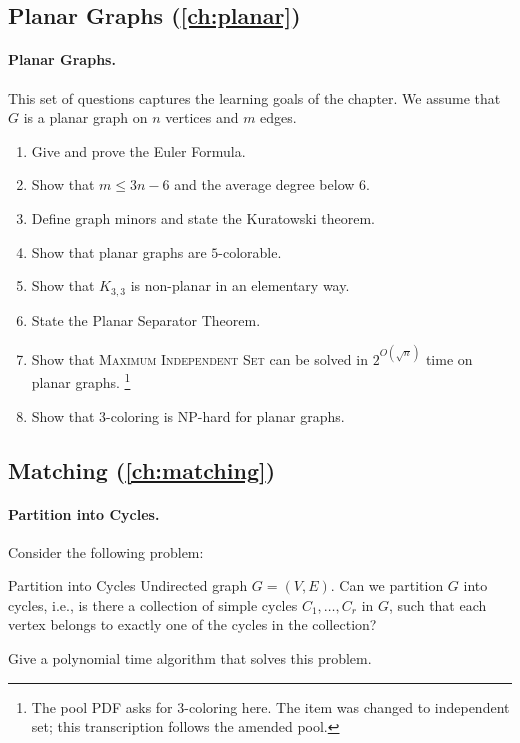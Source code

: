 \subsection*{Planar Graphs (\cref{ch:planar})}

\paragraph{Planar Graphs.}
This set of questions captures the learning goals of the chapter. We assume
that $G$ is a planar graph on $n$ vertices and $m$ edges.
\begin{enumerate}
  \item Give and prove the Euler Formula.
  \item Show that $m \le 3n-6$ and the average degree below $6$.
  \item Define graph minors and state the Kuratowski theorem.
  \item Show that planar graphs are $5$-colorable.
  \item Show that $K_{3,3}$ is non-planar in an elementary way.
  \item State the Planar Separator Theorem.
  \item Show that \textsc{Maximum Independent Set} can be solved in
        $2^{O(\sqrt{n})}$ time on planar graphs.%
        \footnote{The pool PDF asks for $3$-coloring here. The item was changed
        to independent set; this transcription follows the amended pool.}
  \item Show that $3$-coloring is NP-hard for planar graphs.
\end{enumerate}

\subsection*{Matching (\cref{ch:matching})}

\paragraph{Partition into Cycles.}
Consider the following problem:
\begin{probdef}{Partition into Cycles}
  \instance Undirected graph $G = (V,E)$.
  \question Can we partition $G$ into cycles, i.e., is there a collection of
  simple cycles $C_1, \ldots, C_r$ in $G$, such that each vertex belongs to
  exactly one of the cycles in the collection?
\end{probdef}
Give a polynomial time algorithm that solves this problem.

